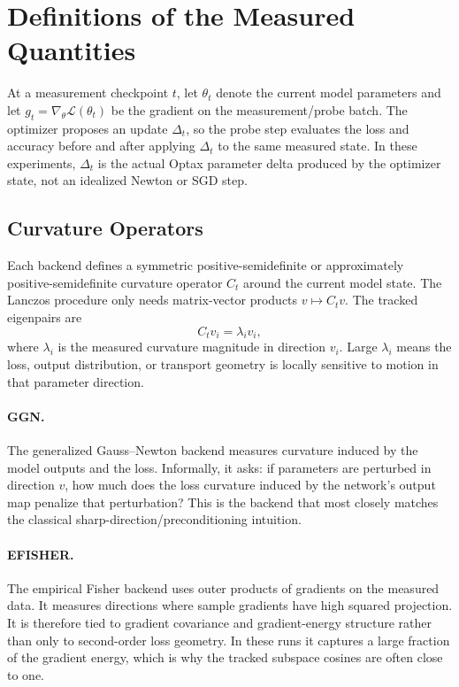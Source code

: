 \documentclass[11pt]{article}
\begin{document}
\section{Definitions of the Measured Quantities}

At a measurement checkpoint $t$, let $\theta_t$ denote the current model
parameters and let $g_t = \nabla_\theta \mathcal{L}(\theta_t)$ be the gradient
on the measurement/probe batch. The optimizer proposes an update
$\Delta_t$, so the probe step evaluates the loss and accuracy before and after
applying $\Delta_t$ to the same measured state. In these experiments,
$\Delta_t$ is the actual Optax parameter delta produced by the optimizer
state, not an idealized Newton or SGD step.

\subsection{Curvature Operators}

Each backend defines a symmetric positive-semidefinite or approximately
positive-semidefinite curvature operator $C_t$ around the current model state.
The Lanczos procedure only needs matrix-vector products $v \mapsto C_t v$.
The tracked eigenpairs are
\[
    C_t v_i = \lambda_i v_i,
\]
where $\lambda_i$ is the measured curvature magnitude in direction $v_i$.
Large $\lambda_i$ means the loss, output distribution, or transport geometry
is locally sensitive to motion in that parameter direction.

\paragraph{GGN.}
The generalized Gauss--Newton backend measures curvature induced by the model
outputs and the loss. Informally, it asks: if parameters are perturbed in
direction $v$, how much does the loss curvature induced by the network's
output map penalize that perturbation? This is the backend that most closely
matches the classical sharp-direction/preconditioning intuition.

\paragraph{EFISHER.}
The empirical Fisher backend uses outer products of gradients on the measured
data. It measures directions where sample gradients have high squared
projection. It is therefore tied to gradient covariance and gradient-energy
structure rather than only to second-order loss geometry. In these runs it
captures a large fraction of the gradient energy, which is why the tracked
subspace cosines are often close to one.
\end{document}
